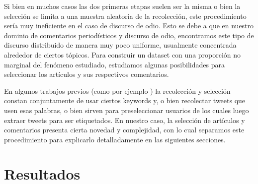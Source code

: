Si bien en muchos casos las dos primeras etapas suelen ser la misma o bien la selección se limita a una muestra aleatoria de la recolección, este procedimiento sería muy ineficiente en el caso de discurso de odio. Esto se debe a que en nuestro dominio de comentarios periodísticos y discurso de odio, encontramos este tipo de discurso distribuido de manera muy poco uniforme, usualmente concentrada alrededor de ciertos tópicos. Para construir un dataset con una proporción no marginal del fenómeno estudiado, estudiamos algunas posibilidades para seleccionar los artículos y sus respectivos comentarios.

En algunos trabajos previos (como por ejemplo \citet{waseem2016hateful,hateval2019semeval}) la recolección y selección constan conjuntamente de usar ciertos keywords y, o bien recolectar tweets que usen esas palabras, o bien sirven para preseleccionar usuarios de los cuales luego extraer tweets para ser etiquetados. En nuestro caso, la selección de artículos y comentarios presenta cierta novedad y complejidad, con lo cual separamos este procedimiento para explicarlo detalladamente en las siguientes secciones.





\section{Resultados}

